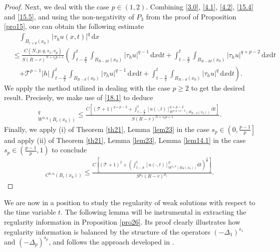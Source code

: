 \documentclass[reqno,10pt]{amsart}
\numberwithin{equation}{section}
\begin{document}
\begin{proof}
	Next, we deal with the case $p\in(1, 2)$. Combining \eqref{3.0}, \eqref{4.1}, \eqref{4.2}, \eqref{15.4} and \eqref{15.5}, and using the non-negativity of $P_3$ from the proof of Proposition \ref{pro15}, one can obtain the following estimate
	\begin{align}
		\label{22.1}
		&\quad\int_{B_{r+d}(x_0)}|\tau_hu(x,t)|^{q}\,\mathrm{d}x\nonumber\\
		&\le \frac{C(N,p,q,s_1,s_p)}{S(R-r)^{N+s_pp+1}}\left(\int_{t-\frac{S}{2}}^{t}\int_{B_{R-2d}(x_0)}|\tau_hu|^{q-1}\,\mathrm{d}x\mathrm{d}t+\int_{t-\frac{S}{2}}^{t}\int_{B_{R-2d}(x_0)}|\tau_hu|^{q+p-2}\,\mathrm{d}x\mathrm{d}t\right.\nonumber\\
		&\quad\left.+\mathcal{T}^{p-1}|h|\int_{t-\frac{S}{2}}^{t}\int_{B_{R-d}(x_0)}|\tau_hu|^{q-1}\,\mathrm{d}x\mathrm{d}t+\int_{t-\frac{S}{2}}^{t}\int_{B_{R-d}(x_0)}|\tau_hu|^{q}\,\mathrm{d}x\mathrm{d}t\right).
	\end{align}
	We apply the method utilized in dealing with the case $p\ge2$ to get the desired result. Precisely, we make use of \eqref{18.1} to deduce
	\begin{align*}
		[u(\cdot,t)]^q_{W^{\tilde{\alpha},q}(B_r(x_0))}\le\frac{C\left[ \left( \mathcal{T}+1\right)^{q+p-2}+\int_{t-\frac{S}{2}}^{t}[u(\cdot,t)]^{q+p-2}_{W^{\sigma,q+p-2}(B_{R-d}(x_0))}\,\mathrm{d}t\right]}{S(R-r)^{N+s_pp+1}}.
	\end{align*}
	Finally, we apply (i) of Theorem \ref{th21}, Lemma \ref{lem23} in the case $s_p\in\left(0,\frac{p-1}{p}\right]$ and apply (ii) of Theorem \ref{th21}, Lemma \ref{lem23}, Lemma \ref{lem14.1} in the case $s_p\in\left( \frac{p-1}{p},1\right)$ to conclude
	\begin{align*}
		[u(\cdot,t)]_{C^{0,\alpha}(B_r(x_0))}\le\frac{C\left[ \left( \mathcal{T}+1\right)^2+\left( \int_{t-S}^{t}[u(\cdot,t)]^p_{W^{s_p,p}\left( B_R(x_0)\right)}\mathrm{d}t\right)^{\frac{2}{p}}\right] }{S^{\mu_2}(R-r)^{\mu_1}}.
	\end{align*}
\end{proof}



We are now in a position to study the regularity of weak solutions with respect to the time variable $t$. The following lemma will be instrumental in extracting the regularity information in Proposition \ref{pro26}. Its proof clearly illustrates how regularity information is balanced by the structure of the operators $(-\Delta_1)^{s_1}$ and $(-\Delta_p)^{s_p}$, and follows the approach developed in \cite[Proposition 6.2]{BLS21}.
\end{document}
